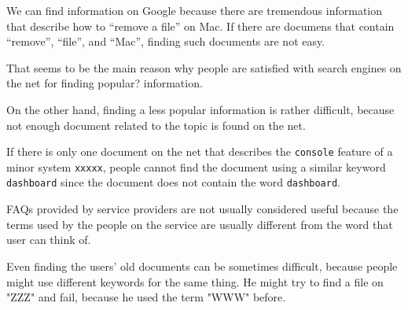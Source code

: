 \documentclass[manuscript,screen,review]{acmart}
\begin{document}
We can find information on Google because there are tremendous information
that describe how to ``remove a file'' on Mac.
If there are documens that contain ``remove'', ``file'', and ``Mac'',
finding such documents are not easy.

That seems to be the main reason why people are satisfied with search engines on the net
for finding popular? information.



On the other hand,
finding a less popular information is rather difficult,
because not enough document related to the topic is found on the net.

If there is only one document on the net
that describes the \texttt{console} feature of a minor system \texttt{xxxxx},
people cannot find the document using a similar keyword \texttt{dashboard}
since the document does not contain the word \texttt{dashboard}.



FAQs provided by service providers are not usually considered useful
because the terms used by the people on the service are usually
different from the word that user can think of.


Even finding the users' old documents can be sometimes difficult,
because people might use different keywords for the same
thing. He might try to find a file on "ZZZ" and fail, because he used
the term "WWW" before.

\end{document}

